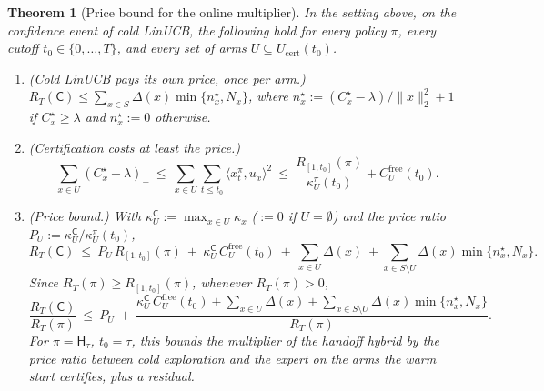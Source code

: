 \documentclass{article}
\newtheorem{theorem}{Theorem}
\theoremstyle{definition}
\theoremstyle{remark}
\theoremstyle{remark}
\newcommand{\Cold}{\mathsf{C}}
\newcommand{\Hyb}{\mathsf{H}}
\begin{document}
\begin{theorem}[Price bound for the online multiplier]
\label{thm:general-price}
In the setting above, on the confidence event of cold LinUCB, the following
hold for every policy $\pi$, every cutoff $t_0\in\{0,\dots,T\}$, and every
set of arms $U\subseteq U_{\mathrm{cert}}(t_0)$.
\begin{enumerate}[itemsep=1pt,topsep=1pt,leftmargin=*]
\item[(a)] \emph{(Cold LinUCB pays its own price, once per arm.)}
$R_T(\Cold)\le\sum_{x\in S}\Delta(x)\min\{n^\star_x,N_x\}$, where
$n^\star_x:=(C^\star_x-\lambda)/\|x\|_2^2+1$ if $C^\star_x\ge\lambda$ and $n^\star_x:=0$ otherwise.
\item[(b)] \emph{(Certification costs at least the price.)}
\[
\sum_{x\in U}(C^\star_x-\lambda)_+\ \le\ \sum_{x\in U}\sum_{t\le t_0}\langle x^\pi_t,u_x\rangle^2
\ \le\ \frac{R_{[1,t_0]}(\pi)}{\kappa^\pi_U(t_0)}+C^{\mathrm{free}}_U(t_0).
\]
\item[(c)] \emph{(Price bound.)} With $\kappa^{\Cold}_U:=\max_{x\in U}\kappa_x$
($:=0$ if $U=\emptyset$) and the price ratio
$P_U:=\kappa^{\Cold}_U/\kappa^\pi_U(t_0)$,
\[
R_T(\Cold)\ \le\ P_U\,R_{[1,t_0]}(\pi)\ +\ \kappa^{\Cold}_U\,C^{\mathrm{free}}_U(t_0)\ +\ \sum_{x\in U}\Delta(x)
\ +\sum_{x\in S\setminus U}\Delta(x)\min\{n^\star_x,N_x\}.
\]
Since $R_T(\pi)\ge R_{[1,t_0]}(\pi)$, whenever $R_T(\pi)>0$,
\begin{equation}
\label{eq:general-price}
\frac{R_T(\Cold)}{R_T(\pi)}\ \le\ P_U\ +\
\frac{\kappa^{\Cold}_U\,C^{\mathrm{free}}_U(t_0)+\sum_{x\in U}\Delta(x)+\sum_{x\in S\setminus U}\Delta(x)\min\{n^\star_x,N_x\}}{R_T(\pi)} .
\end{equation}
For $\pi=\Hyb_\tau$, $t_0=\tau$, this bounds the multiplier of the handoff
hybrid by the price ratio between cold exploration and the expert on the
arms the warm start certifies, plus a residual.
\end{enumerate}
\end{theorem}
\end{document}
